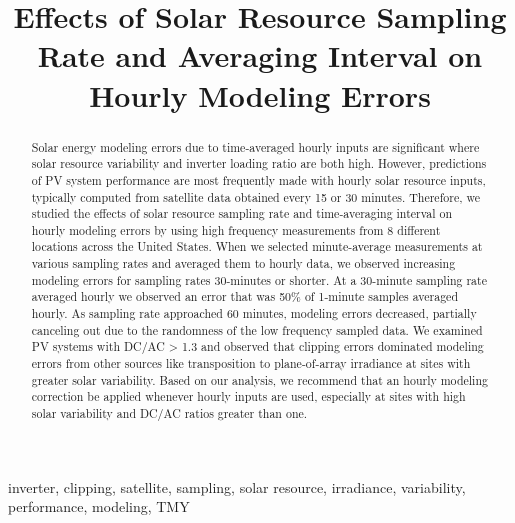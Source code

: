 \documentclass[conference]{IEEEtran}
\begin{document}
\title{Effects of Solar Resource Sampling Rate and Averaging Interval on Hourly Modeling Errors}

\author{
}

\maketitle

\begin{abstract}
Solar energy modeling errors due to time-averaged hourly inputs are significant where solar resource variability and inverter loading ratio are both high. However, predictions of PV system performance are most frequently made with hourly solar resource inputs, typically computed from satellite data obtained every 15 or 30 minutes. Therefore, we studied the effects of solar resource sampling rate and time-averaging interval on hourly modeling errors by using high frequency measurements from 8 different locations across the United States. When we selected minute-average measurements at various sampling rates and averaged them to hourly data, we observed increasing modeling errors for sampling rates 30-minutes or shorter. At a 30-minute sampling rate averaged hourly we observed an error that was 50\% of 1-minute samples averaged hourly. As sampling rate approached 60 minutes, modeling errors decreased, partially canceling out due to the randomness of the low frequency sampled data. We examined PV systems with DC/AC > 1.3 and observed that clipping errors dominated modeling errors from other sources like transposition to plane-of-array irradiance at sites with greater solar variability. Based on our analysis, we recommend that an hourly modeling correction be applied whenever hourly inputs are used, especially at sites with high solar variability and DC/AC ratios greater than one.
\end{abstract}

\begin{IEEEkeywords}
inverter, clipping, satellite, sampling, solar resource, irradiance, variability, performance, modeling, TMY
\end{IEEEkeywords}
\end{document}
